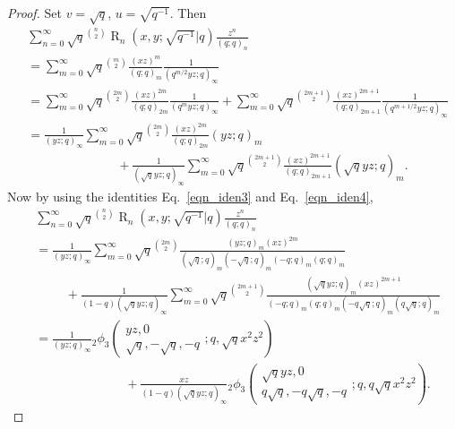 \documentclass[10pt,a4paper]{amsart}
\DeclareMathOperator{\opR}{R}
\begin{document}
\begin{proof}
Set $v=\sqrt{q}$, $u=\sqrt{q^{-1}}$. Then
    \begin{align*}
        &\sum_{n=0}^{\infty}\sqrt{q}^{\binom{n}{2}}\opR_{n}(x,y;\sqrt{q^{-1}}|q)\frac{z^n}{(q;q)_{n}}\\
        &=\sum_{m=0}^{\infty}\sqrt{q}^{\binom{m}{2}}\frac{(xz)^m}{(q;q)_{m}}\frac{1}{(q^{m/2}yz;q)_{\infty}}\\
        &=\sum_{m=0}^{\infty}\sqrt{q}^{\binom{2m}{2}}\frac{(xz)^{2m}}{(q;q)_{2m}}\frac{1}{(q^{m}yz;q)_{\infty}}+\sum_{m=0}^{\infty}\sqrt{q}^{\binom{2m+1}{2}}\frac{(xz)^{2m+1}}{(q;q)_{2m+1}}\frac{1}{(q^{m+1/2}yz;q)_{\infty}}\\
        &=\frac{1}{(yz;q)_{\infty}}\sum_{m=0}^{\infty}\sqrt{q}^{\binom{2m}{2}}\frac{(xz)^{2m}}{(q;q)_{2m}}(yz;q)_{m}\\
        &\hspace{3cm}+\frac{1}{(\sqrt{q}yz;q)_{\infty}}\sum_{m=0}^{\infty}\sqrt{q}^{\binom{2m+1}{2}}\frac{(xz)^{2m+1}}{(q;q)_{2m+1}}(\sqrt{q}yz;q)_{m}.
    \end{align*}
Now by using the identities Eq.~\eqref{eqn_iden3} and Eq.~\eqref{eqn_iden4},
\begin{align*}
    &\sum_{n=0}^{\infty}\sqrt{q}^{\binom{n}{2}}\opR_{n}(x,y;\sqrt{q^{-1}}|q)\frac{z^n}{(q;q)_{n}}\\
    &=\frac{1}{(yz;q)_{\infty}}\sum_{m=0}^{\infty}\sqrt{q}^{\binom{2m}{2}}\frac{(yz;q)_{m}(xz)^{2m}}{(\sqrt{q};q)_{m}(-\sqrt{q};q)_{m}(-q;q)_{m}(q;q)_{m}}\\
        &\hspace{1cm}+\frac{1}{(1-q)(\sqrt{q}yz;q)_{\infty}}\sum_{m=0}^{\infty}\sqrt{q}^{\binom{2m+1}{2}}\frac{(\sqrt{q}yz;q)_{m}(xz)^{2m+1}}{(-q;q)_{m}(q;q)_{m}(-q\sqrt{q};q)_{m}(q\sqrt{q};q)_{m}}\\
        &=\frac{1}{(yz;q)_{\infty}}{}_{2}\phi_{3}\left(
        \begin{array}{c}
            yz,0\\
             \sqrt{q},-\sqrt{q},-q
        \end{array};
        q,\sqrt{q}x^2z^2
        \right)\\
        &\hspace{3cm}+\frac{xz}{(1-q)(\sqrt{q}yz;q)_{\infty}}{}_{2}\phi_{3}\left(
        \begin{array}{c}
            \sqrt{q}yz,0\\
             q\sqrt{q},-q\sqrt{q},-q
        \end{array};
        q,q\sqrt{q}x^2z^2
        \right).
\end{align*}
\end{proof}
\end{document}
